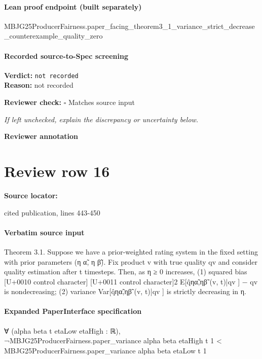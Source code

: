 \documentclass[10pt]{article}
\newcommand{\reviewerbox}{%
  \par\noindent\fbox{\parbox{0.96\linewidth}{\rule{0pt}{0.38in}}}\par
}
\newcommand{\reviewmatch}[1]{%
  \par\noindent\textbf{Reviewer check:} $\square$\; #1\par
  \noindent\emph{If left unchecked, explain the discrepancy or uncertainty below.}\par
}
\begin{document}
\paragraph{Lean proof endpoint (built separately)}\begin{ReviewVerbatim}
MBJG25ProducerFairness.paper_facing_theorem3_1_variance_strict_decrease_counterexample_quality_zero
\end{ReviewVerbatim}

\paragraph{Recorded source-to-Spec screening}
\textbf{Verdict:} \texttt{not recorded}
\\
\textbf{Reason:} not recorded
\reviewmatch{Matches source input}
\noindent\textbf{Reviewer annotation}\par
\reviewerbox
\clearpage
\hypertarget{source-claim-464dc3b105b500a1}{}
\section*{Review row 16}
\textbf{Source locator:} {\footnotesize\raggedright cited publication, lines 443-\allowbreak{}450\par}
\paragraph{Verbatim source input}
\begin{ReviewVerbatim}
Theorem 3.1. Suppose we have a prior-weighted rating system in the fixed setting with prior parameters (η α̃, η β̃). Fix
product v with true quality qv and consider quality estimation after t timesteps.
Then, as η
≥ 0 increases, (1) squared bias
[U+0010 control character]
[U+0011 control character]2
E[q̂ηα̃,ηβ̃ (v, t)|qv ] − qv
is nondecreasing; (2) variance Var[q̂ηα̃,ηβ̃ (v, t)|qv ] is strictly decreasing in η.
\end{ReviewVerbatim}


\paragraph{Expanded PaperInterface specification}
\begin{ReviewVerbatim}
∀ (alpha beta t etaLow etaHigh : ℝ),
  ¬MBJG25ProducerFairness.paper_variance alpha beta etaHigh t 1 <
      MBJG25ProducerFairness.paper_variance alpha beta etaLow t 1
\end{ReviewVerbatim}
\end{document}
